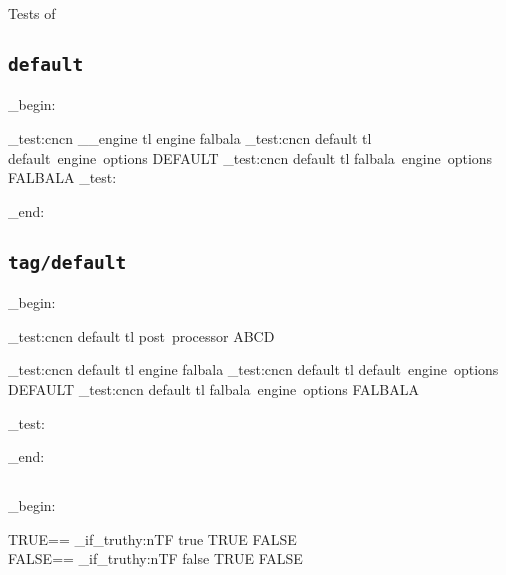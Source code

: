 Tests of 
\noindent

\newcommand\meta[1]{{$\langle$}{\itshape #1}{$\rangle$}}

\subsection{\texttt{default}}
\ExplSyntaxOn
\group_begin:
\ExplSyntaxOff


\ExplSyntaxOn

\CDR_test:cncn { __engine } { tl } { engine } { falbala }
\CDR_test:cncn { default } { tl } { default~engine~options } { DEFAULT }
\CDR_test:cncn { default } { tl } { falbala~engine~options } { FALBALA }
\CDR_test:

\group_end:

\ExplSyntaxOff


\ExplSyntaxOn

\makeatletter
\def\CDR@Debug{\typeout}
\makeatother

\ExplSyntaxOff

\subsection{\texttt{tag/default}}
\ExplSyntaxOn
\group_begin:
\ExplSyntaxOff


\ExplSyntaxOn
\CDR_test:cncn { default } { tl } { post~processor } { ABCD }

\CDR_test:cncn { default } { tl } { engine } { falbala }
\CDR_test:cncn { default } { tl } { default~engine~options } { DEFAULT }
\CDR_test:cncn { default } { tl } { falbala~engine~options } { FALBALA }

\CDR_test:

\group_end:
\ExplSyntaxOff

\subsection{}
\ExplSyntaxOn
\group_begin:

TRUE==
\CDR_if_truthy:nTF { true } {
  TRUE
} {
  FALSE
}\\
FALSE==
\CDR_if_truthy:nTF { false } {
  TRUE
} {
  FALSE
}\\

